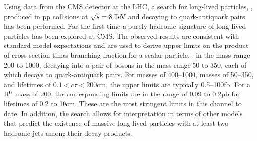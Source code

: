 Using data from the CMS detector at the LHC,
a search for long-lived particles, \X, produced in pp collisions at $\sqrt{s} = 8\,\text{Te\hspace{-.08em}V}$ and decaying
to quark-antiquark pairs has been performed. For the first time a purely hadronic signature
of long-lived particles has been explored at CMS.
The observed results are consistent with standard model expectations and are used to derive upper
limits on the product of cross section times branching fraction for a scalar particle,
 \Higgs, in the mass range 200 to 1000\GeV, decaying into a pair of \X bosons in the mass
range 50 to 350\GeV, each of which decays to quark-antiquark pairs. For \Higgs masses of 400--1000\GeV, \X
masses of 50--350\GeV, and \X lifetimes of $0.1<c\tau<200$\:cm, the upper limits are typically 0.5--100\:fb.
 For a $\mathrm{H}^{0}$ mass of 200\GeV, the corresponding limits are in the range of 0.09 to 0.2\:pb for \X
lifetimes of 0.2 to 10\:cm. These are the most stringent limits in this channel to date.
In addition, the search allows for interpretation in terms of other models that predict 
the existence of massive long-lived particles with at least two hadronic
jets among their decay products.
